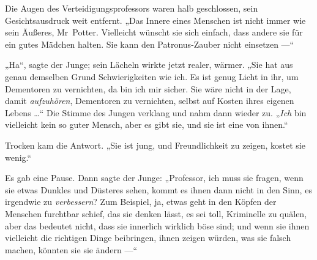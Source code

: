 Die Augen des Verteidigungsprofessors waren halb geschlossen, sein Gesichtsausdruck weit entfernt.
„Das Innere eines Menschen ist nicht immer wie sein Äußeres, Mr~Potter. Vielleicht wünscht sie sich einfach, dass andere sie für ein gutes Mädchen halten. Sie kann den Patronus-Zauber nicht einsetzen —“

„Ha“, sagte der Junge; sein Lächeln wirkte jetzt realer, wärmer.
„Sie hat aus genau demselben Grund Schwierigkeiten wie ich. Es ist genug Licht in ihr, um Dementoren zu vernichten, da bin ich mir sicher. Sie wäre nicht in der Lage, damit \emph{aufzuhören}, Dementoren zu vernichten, selbst auf Kosten ihres eigenen Lebens …“ Die Stimme des Jungen verklang und nahm dann wieder zu.
„\emph{Ich} bin vielleicht kein so guter Mensch, aber es gibt sie, und sie ist eine von ihnen.“

Trocken kam die Antwort.
„Sie ist jung, und Freundlichkeit zu zeigen, kostet sie wenig.“

Es gab eine Pause. Dann sagte der Junge:
„Professor, ich muss sie fragen, wenn sie etwas Dunkles und Düsteres sehen, kommt es ihnen dann nicht in den Sinn, es irgendwie zu \emph{verbessern}? Zum Beispiel, ja, etwas geht in den Köpfen der Menschen furchtbar schief, das sie denken lässt, es sei toll, Kriminelle zu quälen, aber das bedeutet nicht, dass sie innerlich wirklich böse sind; und wenn sie ihnen vielleicht die richtigen Dinge beibringen, ihnen zeigen würden, was sie falsch machen, könnten sie sie ändern —“

